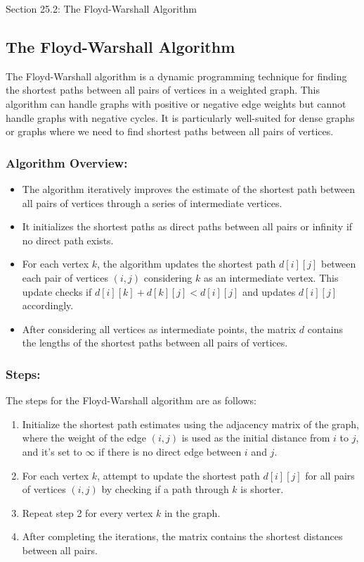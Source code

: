 \begin{notes}{Section 25.2: The Floyd-Warshall Algorithm}
    \subsection*{The Floyd-Warshall Algorithm}

    The Floyd-Warshall algorithm is a dynamic programming technique for finding the shortest paths between all pairs of vertices in a weighted graph. This algorithm can handle graphs with positive 
    or negative edge weights but cannot handle graphs with negative cycles. It is particularly well-suited for dense graphs or graphs where we need to find shortest paths between all pairs of 
    vertices. \vspace*{1em}
    
    \subsubsection*{Algorithm Overview:}
    
    \begin{itemize}
        \item The algorithm iteratively improves the estimate of the shortest path between all pairs of vertices through a series of intermediate vertices.
        \item It initializes the shortest paths as direct paths between all pairs or infinity if no direct path exists.
        \item For each vertex $k$, the algorithm updates the shortest path $d[i][j]$ between each pair of vertices $(i, j)$ considering $k$ as an intermediate vertex. This update checks if 
        $d[i][k] + d[k][j] < d[i][j]$ and updates $d[i][j]$ accordingly.
        \item After considering all vertices as intermediate points, the matrix $d$ contains the lengths of the shortest paths between all pairs of vertices.
    \end{itemize}
    
    \subsubsection*{Steps:}
    
    The steps for the Floyd-Warshall algorithm are as follows:
    \begin{enumerate}
        \item Initialize the shortest path estimates using the adjacency matrix of the graph, where the weight of the edge $(i, j)$ is used as the initial distance from $i$ to $j$, and it's set to 
        $\infty$ if there is no direct edge between $i$ and $j$.
        \item For each vertex $k$, attempt to update the shortest path $d[i][j]$ for all pairs of vertices $(i, j)$ by checking if a path through $k$ is shorter.
        \item Repeat step 2 for every vertex $k$ in the graph.
        \item After completing the iterations, the matrix contains the shortest distances between all pairs.
    \end{enumerate}
    

\end{notes}
